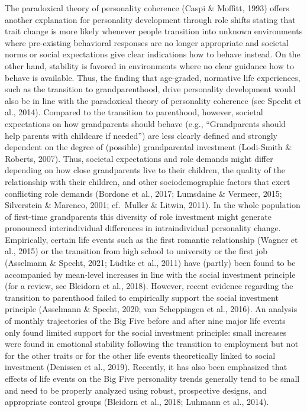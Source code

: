\documentclass[
  english,
  man, noextraspace]{apa7}
\begin{document}
The paradoxical theory of personality coherence (Caspi \& Moffitt, 1993) offers another explanation for personality development through role shifts stating that trait change is more likely whenever people transition into unknown environments where pre-existing behavioral responses are no longer appropriate and societal norms or social expectations give clear indications how to behave instead. On the other hand, stability is favored in environments where no clear guidance how to behave is available. Thus, the finding that age-graded, normative life experiences, such as the transition to grandparenthood, drive personality development would also be in line with the paradoxical theory of personality coherence (see Specht et al., 2014). Compared to the transition to parenthood, however, societal expectations on how grandparents should behave (e.g., \enquote{Grandparents should help parents with childcare if needed}) are less clearly defined and strongly dependent on the degree of (possible) grandparental investment (Lodi-Smith \& Roberts, 2007). Thus, societal expectations and role demands might differ depending on how close grandparents live to their children, the quality of the relationship with their children, and other sociodemographic factors that exert conflicting role demands (Bordone et al., 2017; Lumsdaine \& Vermeer, 2015; Silverstein \& Marenco, 2001; cf.~Muller \& Litwin, 2011). In the whole population of first-time grandparents this diversity of role investment might generate pronounced interindividual differences in intraindividual personality change.\\
Empirically, certain life events such as the first romantic relationship (Wagner et al., 2015) or the transition from high school to university or the first job (Asselmann \& Specht, 2021; Lüdtke et al., 2011) have (partly) been found to be accompanied by mean-level increases in line with the social investment principle (for a review, see Bleidorn et al., 2018). However, recent evidence regarding the transition to parenthood failed to empirically support the social investment principle (Asselmann \& Specht, 2020; van Scheppingen et al., 2016). An analysis of monthly trajectories of the Big Five before and after nine major life events only found limited support for the social investment principle: small increases were found in emotional stability following the transition to employment but not for the other traits or for the other life events theoretically linked to social investment (Denissen et al., 2019). Recently, it has also been emphasized that effects of life events on the Big Five personality trends generally tend to be small and need to be properly analyzed using robust, prospective designs, and appropriate control groups (Bleidorn et al., 2018; Luhmann et al., 2014).\\
\end{document}
